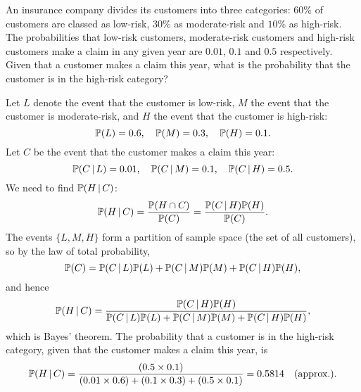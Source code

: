 \begin{exercise}
\begin{questions}

\question
An insurance company divides its customers into three categories: $60$\% of customers are classed as low-risk, $30$\% as moderate-risk and $10$\% as high-risk. The probabilities that low-risk customers, moderate-risk customers and high-risk customers make a claim in any given year are $0.01$, $0.1$ and $0.5$ respectively. Given that a customer makes a claim this year, what is the probability that the customer is in the high-risk category?

\begin{answer}
Let $L$ denote the event that the customer is low-risk, $M$ the event that the customer is moderate-risk, and $H$ the event that the customer is high-risk:
\[
\mathbb{P}(L) = 0.6,\quad \mathbb{P}(M) = 0.3,\quad \mathbb{P}(H) = 0.1.
\]
Let $C$ be the event that the customer makes a claim this year:
\[
\mathbb{P}(C\,|\,L) = 0.01,\quad \mathbb{P}(C\,|\,M) = 0.1,\quad \mathbb{P}(C\,|\,H) = 0.5.
\]
We need to find $\mathbb{P}(H\,|\,C)$:
\[
\mathbb{P}(H\,|\,C) = \frac{\mathbb{P}(H\cap C)}{\mathbb{P}(C)} = \frac{\mathbb{P}(C\,|\,H)\mathbb{P}(H)}{\mathbb{P}(C)}.
\]
The events $\{L,M,H\}$ form a partition of sample space (the set of all customers), so by the law of total probability,
\[
\mathbb{P}(C) = \mathbb{P}(C\,|\,L)\mathbb{P}(L) + \mathbb{P}(C\,|\,M)\mathbb{P}(M) + \mathbb{P}(C\,|\,H)\mathbb{P}(H),
\]
and hence
\[
\mathbb{P}(H\,|\,C) = \frac{\mathbb{P}(C\,|\,H)\mathbb{P}(H)}{\mathbb{P}(C\,|\,L)\mathbb{P}(L) + \mathbb{P}(C\,|\,M)\mathbb{P}(M) + \mathbb{P}(C\,|\,H)\mathbb{P}(H)},
\]
which is Bayes' theorem. The probability that a customer is in the high-risk category, given that the customer makes a claim this year, is 
\[
\mathbb{P}(H\,|\,C) 
	= \frac{(0.5\times 0.1)}{(0.01\times 0.6) + (0.1\times 0.3) + (0.5\times 0.1)}
	= 0.5814\quad\text{(approx.).}
\]
\end{answer}


\end{questions}
\end{exercise}

\endinput
